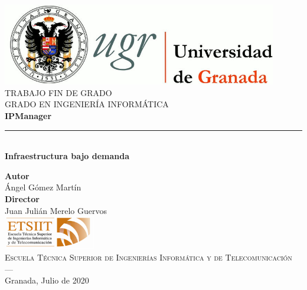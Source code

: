 \begin{titlepage}
 
 
\newlength{\centeroffset}
\setlength{\centeroffset}{-0.5\oddsidemargin}
\addtolength{\centeroffset}{0.5\evensidemargin}
\thispagestyle{empty}

\noindent\hspace*{\centeroffset}\begin{minipage}{\textwidth}

\centering
\includegraphics[width=0.9\textwidth]{imagenes/logo_ugr.jpg}\\[1.4cm]

\textsc{ \Large TRABAJO FIN DE GRADO\\[0.2cm]}
\textsc{GRADO EN INGENIERÍA INFORMÁTICA}\\[1cm]
% 
{\Huge\bfseries IPManager\\}
\noindent\rule[-1ex]{\textwidth}{3pt}\\[3.5ex]
{\large\bfseries Infraestructura bajo demanda}
\end{minipage}

\vspace{2.5cm}
\noindent\hspace*{\centeroffset}\begin{minipage}{\textwidth}
\centering

\textbf{Autor}\\{Ángel Gómez Martín}\\[2.5ex]
\textbf{Director}\\Juan Julián Merelo Guervos\\[2cm]
\includegraphics[width=0.3\textwidth]{imagenes/etsiit_logo.png}\\[0.1cm]
\textsc{Escuela Técnica Superior de Ingenierías Informática y de Telecomunicación}\\
\textsc{---}\\
Granada, Julio de 2020
\end{minipage}
\end{titlepage}


